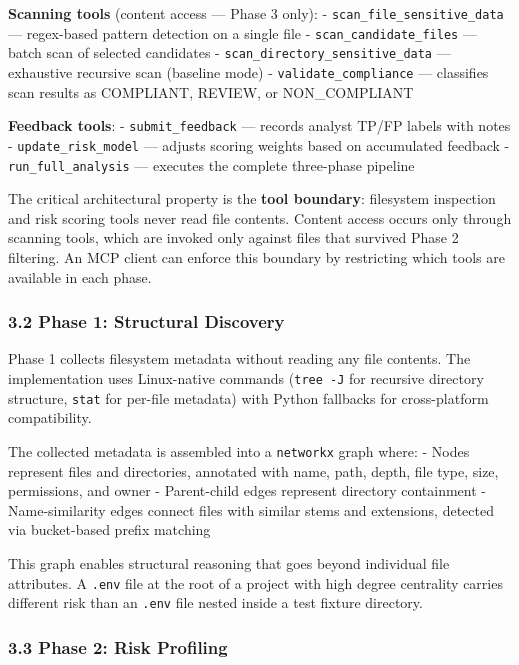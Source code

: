 \documentclass[
]{article}
\begin{document}
\textbf{Scanning tools} (content access --- Phase 3 only): -
\texttt{scan\_file\_sensitive\_data} --- regex-based pattern detection
on a single file - \texttt{scan\_candidate\_files} --- batch scan of
selected candidates - \texttt{scan\_directory\_sensitive\_data} ---
exhaustive recursive scan (baseline mode) -
\texttt{validate\_compliance} --- classifies scan results as COMPLIANT,
REVIEW, or NON\_COMPLIANT

\textbf{Feedback tools}: - \texttt{submit\_feedback} --- records analyst
TP/FP labels with notes - \texttt{update\_risk\_model} --- adjusts
scoring weights based on accumulated feedback -
\texttt{run\_full\_analysis} --- executes the complete three-phase
pipeline

The critical architectural property is the \textbf{tool boundary}:
filesystem inspection and risk scoring tools never read file contents.
Content access occurs only through scanning tools, which are invoked
only against files that survived Phase 2 filtering. An MCP client can
enforce this boundary by restricting which tools are available in each
phase.

\subsubsection{3.2 Phase 1: Structural
Discovery}\label{phase-1-structural-discovery}

Phase 1 collects filesystem metadata without reading any file contents.
The implementation uses Linux-native commands (\texttt{tree\ -J} for
recursive directory structure, \texttt{stat} for per-file metadata) with
Python fallbacks for cross-platform compatibility.

The collected metadata is assembled into a \texttt{networkx} graph
where: - Nodes represent files and directories, annotated with name,
path, depth, file type, size, permissions, and owner - Parent-child
edges represent directory containment - Name-similarity edges connect
files with similar stems and extensions, detected via bucket-based
prefix matching

This graph enables structural reasoning that goes beyond individual file
attributes. A \texttt{.env} file at the root of a project with high
degree centrality carries different risk than an \texttt{.env} file
nested inside a test fixture directory.

\subsubsection{3.3 Phase 2: Risk
Profiling}\label{phase-2-risk-profiling}
\end{document}
